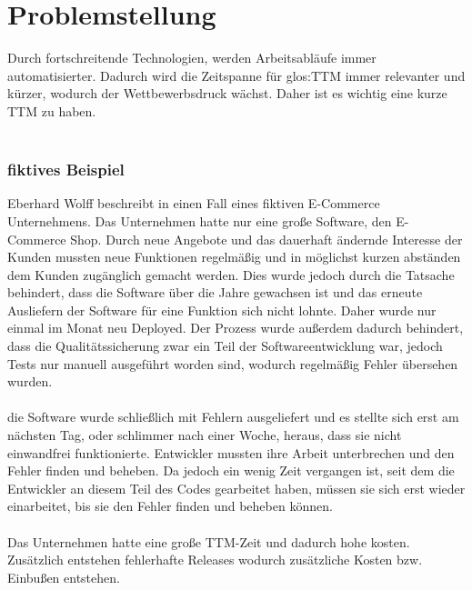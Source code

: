 \section{Problemstellung}
\label{sec:problemstellung}
Durch fortschreitende Technologien, werden Arbeitsabläufe immer automatisierter. Dadurch wird die Zeitspanne für \gls{glos:TTM} immer relevanter und kürzer, wodurch der Wettbewerbsdruck wächst. Daher ist es wichtig eine kurze TTM zu haben.
\\\\
\subsubsection*{fiktives Beispiel}
Eberhard Wolff beschreibt in \cite[S. 2 ff.]{EWolff:CD} einen Fall eines fiktiven E-Commerce Unternehmens.
Das Unternehmen hatte nur eine große Software, den E-Commerce Shop. Durch neue Angebote und das dauerhaft ändernde Interesse der Kunden mussten neue Funktionen regelmäßig und in möglichst kurzen abständen dem Kunden zugänglich gemacht werden. Dies wurde jedoch durch die Tatsache behindert, dass die Software über die Jahre gewachsen ist und das erneute Ausliefern der Software für eine Funktion sich nicht lohnte. Daher wurde nur einmal im Monat neu Deployed. Der Prozess wurde außerdem dadurch behindert, dass die Qualitätssicherung zwar ein Teil der Softwareentwicklung war, jedoch Tests nur manuell ausgeführt worden sind, wodurch regelmäßig Fehler übersehen wurden.
\\\\
die Software wurde schließlich mit Fehlern ausgeliefert und es stellte sich erst am nächsten Tag, oder schlimmer nach einer Woche, heraus, dass sie nicht einwandfrei funktionierte. Entwickler mussten ihre Arbeit unterbrechen und den Fehler finden und beheben. Da jedoch ein wenig Zeit vergangen ist, seit dem die Entwickler an diesem Teil des Codes gearbeitet haben, müssen sie sich erst wieder einarbeitet, bis sie den Fehler finden und beheben können.
\\\\
Das Unternehmen hatte eine große TTM-Zeit und dadurch hohe kosten. Zusätzlich entstehen fehlerhafte Releases wodurch zusätzliche Kosten bzw. Einbußen entstehen.
\\\\
